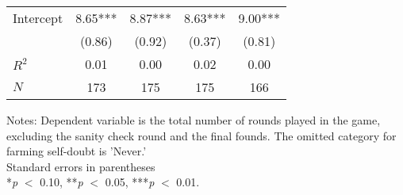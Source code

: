 \begin{table}[htbp]
\begin{threeparttable}
\begin{tabular}{l cccc}
Intercept           &        8.65***&        8.87***&        8.63***&        9.00***\\
                    &      (0.86)   &      (0.92)   &      (0.37)   &      (0.81)   \\
\hline
$R^2$               &        0.01   &        0.00   &        0.02   &        0.00   \\
$N$                 &         173   &         175   &         175   &         166   \\
\hline
\hline
\end{tabular}
\begin{tablenotes}
\footnotesize
\item{Notes: Dependent variable is the total number of rounds played                 in the game, excluding the sanity check round and the final founds.                 The omitted category for farming self-doubt is 'Never.'                 \\ Standard errors in parentheses                 \\ *\textit{p} $<$ 0.10, **\textit{p} $<$ 0.05, ***\textit{p} $<$ 0.01.}
\end{tablenotes}
\end{threeparttable}
\end{table}
